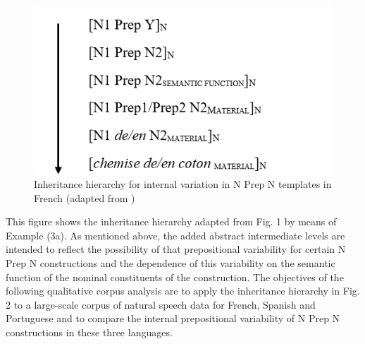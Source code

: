 \documentclass[output=paper]{langsci/langscibook}
\begin{document}
\begin{figure}
\caption{Inheritance hierarchy for internal variation in N Prep N templates in French (adapted from \citet{Masini:2009})\label{fig:henneke:Inheritancehierarchy}}
\includegraphics[scale=0.5]{figures/Inheritancehierarchy.png} 
\end{figure}

This figure shows the inheritance hierarchy adapted from Fig. 1 by means of Example (3a). As mentioned above, the added abstract intermediate levels are intended to reflect the possibility of that prepositional variability for certain N Prep N constructions and the dependence of this variability on the semantic function of the nominal constituents of the construction. The objectives of the following qualitative corpus analysis are to apply the inheritance hierarchy in Fig. 2 to a large-scale corpus of natural speech data for French, Spanish and Portuguese and to compare the internal prepositional variability of N Prep N constructions in these three languages.
\end{document}
